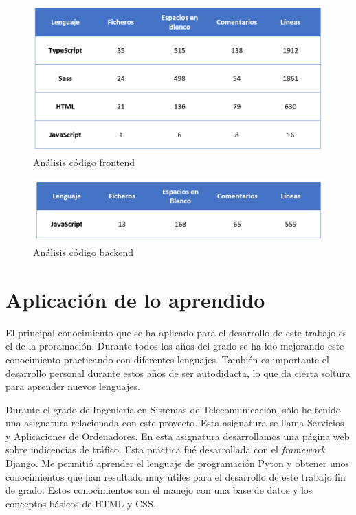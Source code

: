 \documentclass[a4paper, 12pt]{book}
\begin{document}
\begin{figure}[H]
  \centering
  \includegraphics[width=12cm, keepaspectratio]{img/front_a.png}
  \caption{An\'alisis c\'odigo frontend}
  \label{f:front-media}
\end{figure}

\begin{figure}[H]
  \centering
  \includegraphics[width=12cm, keepaspectratio]{img/back_a.png}
  \caption{An\'alisis c\'odigo backend}
  \label{f:back-media}
\end{figure}





\section{Aplicaci\'on de lo aprendido}
\label{sec:aplicacion}

El principal conocimiento que se ha aplicado para el desarrollo de este trabajo es el de la proramaci\'on. Durante todos los a\~nos del grado se ha ido mejorando este conocimiento practicando con diferentes lenguajes. Tambi\'en es importante el desarrollo personal durante estos a\~nos de ser autodidacta, lo que da cierta soltura para aprender nuevos lenguajes. 

Durante el grado de Ingenier\'ia en Sistemas de Telecomunicaci\'on, s\'olo he tenido una asignatura relacionada con este proyecto. Esta asignatura se llama Servicios y Aplicaciones de Ordenadores. En esta asignatura desarrollamos una p\'agina web sobre indicencias de tr\'afico. Esta pr\'actica fu\'e desarrollada con el \emph{framework} Django. Me permiti\'o aprender el lenguaje de programaci\'on Pyton y obtener unos conocimientos que han resultado muy \'utiles para el desarrollo de este trabajo fin de grado. Estos conocimientos son el manejo con una base de datos y los conceptos b\'asicos de HTML y CSS.
\end{document}
